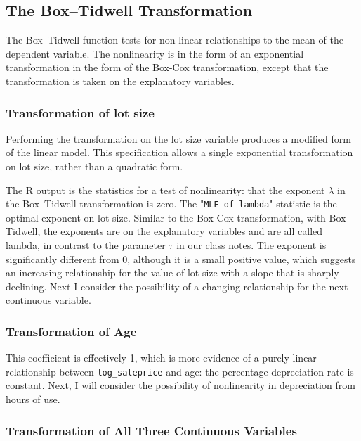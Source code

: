 \documentclass[11pt]{article}
\begin{document}
\subsection{The Box--Tidwell Transformation}

The Box--Tidwell function tests for non-linear relationships
to the mean of the dependent variable.
The nonlinearity is in the form of an
exponential transformation in the form of the Box-Cox
transformation, except that the transformation is taken
on the explanatory variables.


\subsubsection{Transformation of lot size}


Performing the transformation on the lot size variable
produces a modified form of the linear model.
This specification allows a single exponential
transformation on lot size, rather than a quadratic form.



The \textsf{R} output is the statistics for a test of nonlinearity:
that the exponent $\lambda$ in the Box--Tidwell transformation is zero.
%
The "\texttt{MLE of lambda}" statistic is the optimal exponent on lot size.
Similar to the Box-Cox transformation,
with Box-Tidwell, the exponents are on the explanatory variables
and are all called lambda, in contrast
to the parameter $\tau$ in our class notes.
The exponent is significantly different from 0,
although it is a small positive value,
which suggests an increasing relationship
for the value of lot size
with a slope that is sharply declining.
Next I consider the possibility of a changing relationship 
for the next continuous variable. 


\subsubsection{Transformation of Age}




This coefficient is effectively 1, which is more evidence of
a purely linear relationship between \texttt{log\_saleprice}
and age: the percentage depreciation rate is constant.
Next, I will consider the possibility of nonlinearity 
in depreciation from hours of use. 


\subsubsection{Transformation of All Three Continuous Variables}
\end{document}
